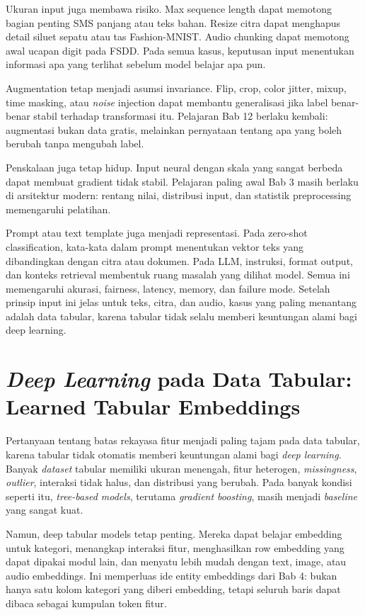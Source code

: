 Ukuran input juga membawa risiko. Max sequence length dapat memotong bagian penting SMS panjang atau teks bahan. Resize citra dapat menghapus detail siluet sepatu atau tas Fashion-MNIST. Audio chunking dapat memotong awal ucapan digit pada FSDD. Pada semua kasus, keputusan input menentukan informasi apa yang terlihat sebelum model belajar apa pun.

Augmentation tetap menjadi asumsi invariance. Flip, crop, color jitter, mixup, time masking, atau \emph{noise} injection dapat membantu generalisasi jika label benar-benar stabil terhadap transformasi itu. Pelajaran Bab 12 berlaku kembali: augmentasi bukan data gratis, melainkan pernyataan tentang apa yang boleh berubah tanpa mengubah label.

Penskalaan juga tetap hidup. Input neural dengan skala yang sangat berbeda dapat membuat gradient tidak stabil. Pelajaran paling awal Bab 3 masih berlaku di arsitektur modern: rentang nilai, distribusi input, dan statistik preprocessing memengaruhi pelatihan.

Prompt atau text template juga menjadi representasi. Pada zero-shot classification, kata-kata dalam prompt menentukan vektor teks yang dibandingkan dengan citra atau dokumen. Pada LLM, instruksi, format output, dan konteks retrieval membentuk ruang masalah yang dilihat model. Semua ini memengaruhi akurasi, fairness, latency, memory, dan failure mode. Setelah prinsip input ini jelas untuk teks, citra, dan audio, kasus yang paling menantang adalah data tabular, karena tabular tidak selalu memberi keuntungan alami bagi deep learning.

\section{\texorpdfstring{\emph{Deep Learning} pada Data Tabular: Learned Tabular Embeddings}{Deep Learning pada Data Tabular: Learned Tabular Embeddings}}\label{deep-learning-pada-data-tabular-learned-tabular-embeddings}

Pertanyaan tentang batas rekayasa fitur menjadi paling tajam pada data tabular, karena tabular tidak otomatis memberi keuntungan alami bagi \emph{deep learning}. Banyak \emph{dataset} tabular memiliki ukuran menengah, fitur heterogen, \emph{missingness}, \emph{outlier}, interaksi tidak halus, dan distribusi yang berubah. Pada banyak kondisi seperti itu, \emph{tree-based models}, terutama \emph{gradient boosting}, masih menjadi \emph{baseline} yang sangat kuat.

Namun, deep tabular models tetap penting. Mereka dapat belajar embedding untuk kategori, menangkap interaksi fitur, menghasilkan row embedding yang dapat dipakai modul lain, dan menyatu lebih mudah dengan text, image, atau audio embeddings. Ini memperluas ide entity embeddings dari Bab 4: bukan hanya satu kolom kategori yang diberi embedding, tetapi seluruh baris dapat dibaca sebagai kumpulan token fitur.

